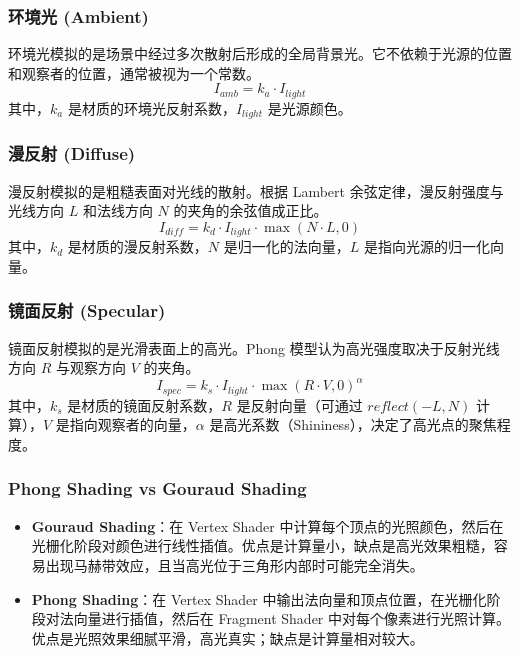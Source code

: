 \documentclass[a4paper]{article}
\begin{document}
\subsubsection{环境光 (Ambient)}
环境光模拟的是场景中经过多次散射后形成的全局背景光。它不依赖于光源的位置和观察者的位置，通常被视为一个常数。
\begin{equation}
    I_{amb} = k_a \cdot I_{light}
\end{equation}
其中，$k_a$ 是材质的环境光反射系数，$I_{light}$ 是光源颜色。

\subsubsection{漫反射 (Diffuse)}
漫反射模拟的是粗糙表面对光线的散射。根据 Lambert 余弦定律，漫反射强度与光线方向 $L$ 和法线方向 $N$ 的夹角的余弦值成正比。
\begin{equation}
    I_{diff} = k_d \cdot I_{light} \cdot \max(N \cdot L, 0)
\end{equation}
其中，$k_d$ 是材质的漫反射系数，$N$ 是归一化的法向量，$L$ 是指向光源的归一化向量。

\subsubsection{镜面反射 (Specular)}
镜面反射模拟的是光滑表面上的高光。Phong 模型认为高光强度取决于反射光线方向 $R$ 与观察方向 $V$ 的夹角。
\begin{equation}
    I_{spec} = k_s \cdot I_{light} \cdot \max(R \cdot V, 0)^{\alpha}
\end{equation}
其中，$k_s$ 是材质的镜面反射系数，$R$ 是反射向量（可通过 $reflect(-L, N)$ 计算），$V$ 是指向观察者的向量，$\alpha$ 是高光系数（Shininess），决定了高光点的聚焦程度。

\subsubsection{Phong Shading vs Gouraud Shading}
\begin{itemize}
    \item \textbf{Gouraud Shading}：在 Vertex Shader 中计算每个顶点的光照颜色，然后在光栅化阶段对颜色进行线性插值。优点是计算量小，缺点是高光效果粗糙，容易出现马赫带效应，且当高光位于三角形内部时可能完全消失。
    \item \textbf{Phong Shading}：在 Vertex Shader 中输出法向量和顶点位置，在光栅化阶段对法向量进行插值，然后在 Fragment Shader 中对每个像素进行光照计算。优点是光照效果细腻平滑，高光真实；缺点是计算量相对较大。
\end{itemize}
\end{document}
